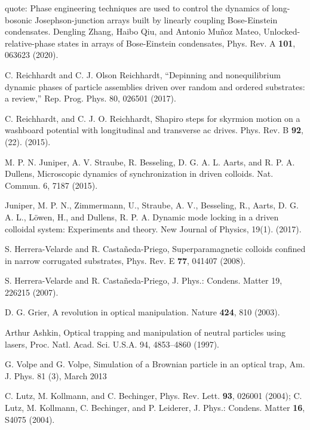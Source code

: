 \documentclass[twocolumn,preprintnumbers,amsmath,amssymb,aps,prx]{revtex4}
\begin{document}
\begin{thebibliography}{99}
      quote: Phase engineering techniques are used to control the dynamics of long-bosonic Josephson-junction arrays built by linearly coupling Bose-Einstein condensates.
     Dengling Zhang, Haibo Qiu, and Antonio Muñoz Mateo, Unlocked-relative-phase states in arrays of Bose-Einstein condensates, Phys. Rev. A {\bf 101}, 063623 (2020).

     C. Reichhardt and C. J. Olson Reichhardt, “Depinning and nonequilibrium dynamic phases of particle assemblies driven over random and ordered substrates: a review,” Rep. Prog. Phys. 80, 026501 (2017).

     C. Reichhardt, and C. J. O. Reichhardt,  Shapiro steps for skyrmion motion on a washboard potential with longitudinal and transverse ac drives. Phys. Rev. B {\bf 92}, (22). (2015).
      
     M. P. N. Juniper, A. V. Straube, R. Besseling, D. G. A. L. Aarts, and R. P. A. Dullens, Microscopic dynamics of synchronization in driven colloids. Nat. Commun. 6, 7187 (2015).

     Juniper, M. P. N., Zimmermann, U., Straube, A. V., Besseling, R., Aarts, D. G. A. L., Löwen, H., and Dullens, R. P. A.  Dynamic mode locking in a driven colloidal system: Experiments and theory. New Journal of Physics, 19(1). (2017).  %
      
     S. Herrera-Velarde and R. Castañeda-Priego, Superparamagnetic colloids confined in narrow corrugated substrates, Phys. Rev. E {\bf 77}, 041407 (2008).

     S. Herrera-Velarde and R. Castañeda-Priego, J. Phys.: Condens. Matter 19, 226215 (2007).

     D. G. Grier, A revolution in optical manipulation. Nature {\bf 424}, 810 (2003).

      Arthur Ashkin, Optical trapping and manipulation of neutral particles using lasers, Proc. Natl. Acad. Sci. U.S.A. 94, 4853–4860 (1997).
        
       G. Volpe and G. Volpe, Simulation of a Brownian particle in an optical trap, Am. J. Phys. 81 (3), March 2013
        
     C. Lutz, M. Kollmann, and C. Bechinger, Phys. Rev. Lett. {\bf 93}, 026001 (2004); C. Lutz, M. Kollmann, C. Bechinger, and P. Leiderer, J. Phys.: Condens. Matter {\bf 16}, S4075 (2004).


\end{thebibliography}
\end{document}
